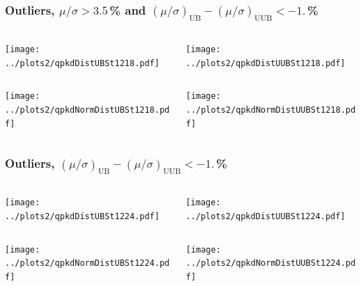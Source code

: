\documentclass[aspectratio=169]{beamer}
\begin{document}
\begin{frame}
  \frametitle{Outliers, $\mu/\sigma > 3.5$\,\% and 
  $\left(\mu/\sigma\right)_{\mathrm{UB}} 
  - \left(\mu/\sigma\right)_{\mathrm{UUB}} < -1.$\,\% }
  \vspace{0.2cm}
  \begin{columns}
    \begin{column}{0.5\textwidth}
      \texttt{[image: ../plots2/qpkdDistUBSt1218.pdf]}
    \end{column}
    \begin{column}{0.5\textwidth}
      \texttt{[image: ../plots2/qpkdDistUUBSt1218.pdf]}
    \end{column}
  \end{columns}
  \begin{columns}
    \begin{column}{0.5\textwidth}
      \texttt{[image: ../plots2/qpkdNormDistUBSt1218.pdf]}
    \end{column}
    \begin{column}{0.5\textwidth}
      \texttt{[image: ../plots2/qpkdNormDistUUBSt1218.pdf]}
    \end{column}
  \end{columns}
\end{frame}

\begin{frame}
  \frametitle{Outliers, $\left(\mu/\sigma\right)_{\mathrm{UB}} 
  - \left(\mu/\sigma\right)_{\mathrm{UUB}} < -1.$\,\%}
  \vspace{0.2cm}
  \begin{columns}
    \begin{column}{0.5\textwidth}
      \texttt{[image: ../plots2/qpkdDistUBSt1224.pdf]}
    \end{column}
    \begin{column}{0.5\textwidth}
      \texttt{[image: ../plots2/qpkdDistUUBSt1224.pdf]}
    \end{column}
  \end{columns}
  \begin{columns}
    \begin{column}{0.5\textwidth}
      \texttt{[image: ../plots2/qpkdNormDistUBSt1224.pdf]}
    \end{column}
    \begin{column}{0.5\textwidth}
      \texttt{[image: ../plots2/qpkdNormDistUUBSt1224.pdf]}
    \end{column}
  \end{columns}
\end{frame}
\end{document}
